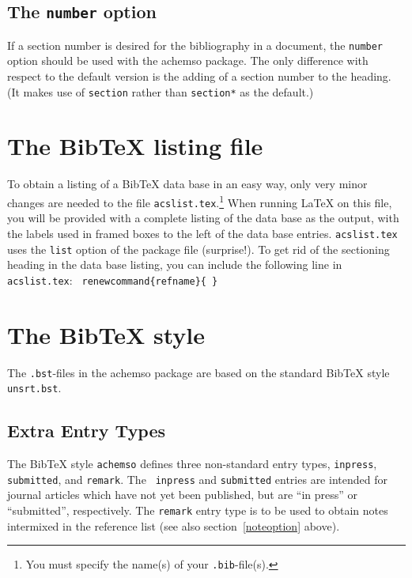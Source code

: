 \documentclass{article}
\begin{document}
\subsection{The \texttt{number} option}

If a section number is desired for the bibliography in a document, the 
\texttt{number} option should be used with the \textsf{achemso} package. The
only difference with respect to the default version is the adding of a
section number to the heading. (It makes use of \texttt{section} rather than 
\texttt{section*} as the default.)

\section{The BibTeX listing file}

To obtain a listing of a BibTeX data base in an easy way, only very minor
changes are needed to the file \texttt{acslist.tex}.\footnote{%
You must specify the name(s) of your \texttt{.bib}-file(s).} When running
LaTeX on this file, you will be provided with a complete listing of the data
base as the output, with the labels used in framed boxes to the left of the
data base entries. \texttt{acslist.tex} uses the \texttt{list} option of the
package file (surprise!). To get rid of the sectioning heading in the data
base listing, you can include the following line in \texttt{acslist.tex}:%
\newline
\texttt{\ renewcommand\{refname\}\{ \}}\newline

\section{The BibTeX style}

The \texttt{.bst}-files in the \textsf{achemso} package are based on the
standard BibTeX style \texttt{unsrt.bst}.

\subsection{Extra Entry Types}

The BibTeX style \texttt{achemso} defines three non-standard entry types, 
\texttt{inpress}, \texttt{submitted}, and \texttt{remark}. The \texttt{%
inpress} and \texttt{submitted} entries are intended for journal articles
which have not yet been published, but are ``in press'' or ``submitted'',
respectively. The \texttt{remark} entry type is to be used to obtain notes
intermixed in the reference list (see also section~\ref{noteoption} above).
\end{document}
